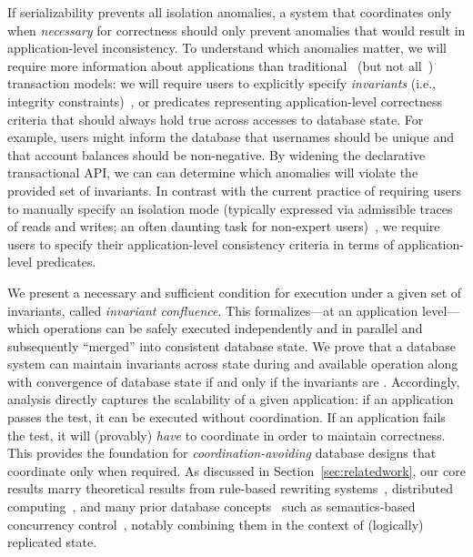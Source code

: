 
If serializability prevents all isolation anomalies, a system that
coordinates only when \textit{necessary} for correctness should only
prevent anomalies that would result in application-level
inconsistency. To understand which anomalies matter, we will require
more information about applications than
traditional~\cite{bernstein-book,gray-virtues} (but not
all~\cite{eswaran-consistency,korth-serializability,decomp-semantics,garciamolina-semantics,activedb-book,ic-survey,ic-survey-two})
transaction models: we will require users to explicitly specify
\textit{invariants} (i.e., integrity constraints)~\cite{traiger-tods},
or predicates representing application-level correctness criteria that
should always hold true across accesses to database state. For
example, users might inform the database that usernames should be
unique and that account balances should be non-negative. By widening
the declarative transactional API, we can can determine which
anomalies will violate the provided set of invariants. In contrast
with the current practice of requiring users to manually specify an
isolation mode (typically expressed via admissible traces of reads and
writes; an often daunting task for non-expert
users)~\cite{consistency-borders}, we require users to specify their
application-level consistency criteria in terms of application-level
predicates.

We present a necessary and sufficient condition for \cfree execution
under a given set of invariants, called \textit{invariant
  confluence}. This \iconfluence formalizes---at an application
level---which operations can be safely executed independently and in
parallel and subsequently ``merged'' into consistent database
state. We prove that a database system can maintain invariants across state
during \cfree and available operation along with convergence of
database state if and only if the invariants are
\iconfluent. Accordingly, \iconfluence analysis directly captures the
scalability of a given application: if an application passes the test,
it can be executed without coordination. If an application fails the
\iconfluence test, it will (provably) \textit{have} to coordinate in
order to maintain correctness. This provides the foundation for
\textit{coordination-avoiding} database designs that coordinate only
when required. As discussed in Section~\ref{sec:relatedwork}, our core
results marry theoretical results from rule-based rewriting
systems~\cite{obs-confluence,termrewriting}, distributed
computing~\cite{herlihy-apologizing,gilbert-cap,hat-vldb}, and many
prior database concepts~\cite{activedb-book,ic-survey,ic-survey-two}
such as semantics-based concurrency
control~\cite{sdd1,decomp-semantics,badrinath-semantics,garciamolina-semantics,korth-serializability,atomictransactions,weihl-thesis},
notably combining them in the context of (logically) replicated state.

